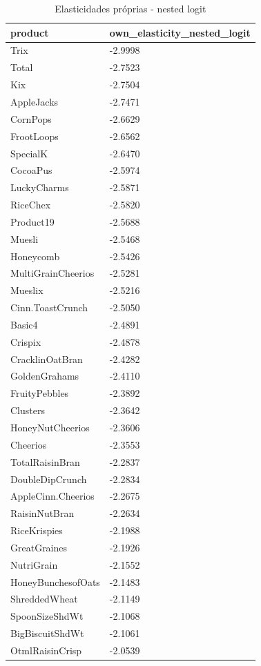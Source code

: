 \begin{table}[!htbp]
\centering
\caption{Elasticidades próprias - nested logit}
\label{tab:own-elas-nested}
\scriptsize
\begin{tabular}{ll}
\hline
product & own\_elasticity\_nested\_logit
\\
\hline
Trix & -2.9998
\\
Total & -2.7523
\\
Kix & -2.7504
\\
AppleJacks & -2.7471
\\
CornPops & -2.6629
\\
FrootLoops & -2.6562
\\
SpecialK & -2.6470
\\
CocoaPus & -2.5974
\\
LuckyCharms & -2.5871
\\
RiceChex & -2.5820
\\
Product19 & -2.5688
\\
Muesli & -2.5468
\\
Honeycomb & -2.5426
\\
MultiGrainCheerios & -2.5281
\\
Mueslix & -2.5216
\\
Cinn.ToastCrunch & -2.5050
\\
Basic4 & -2.4891
\\
Crispix & -2.4878
\\
CracklinOatBran & -2.4282
\\
GoldenGrahams & -2.4110
\\
FruityPebbles & -2.3892
\\
Clusters & -2.3642
\\
HoneyNutCheerios & -2.3606
\\
Cheerios & -2.3553
\\
TotalRaisinBran & -2.2837
\\
DoubleDipCrunch & -2.2834
\\
AppleCinn.Cheerios & -2.2675
\\
RaisinNutBran & -2.2634
\\
RiceKrispies & -2.1988
\\
GreatGraines & -2.1926
\\
NutriGrain & -2.1552
\\
HoneyBunchesofOats & -2.1483
\\
ShreddedWheat & -2.1149
\\
SpoonSizeShdWt & -2.1068
\\
BigBiscuitShdWt & -2.1061
\\
OtmlRaisinCrisp & -2.0539

\end{tabular}
\end{table}
